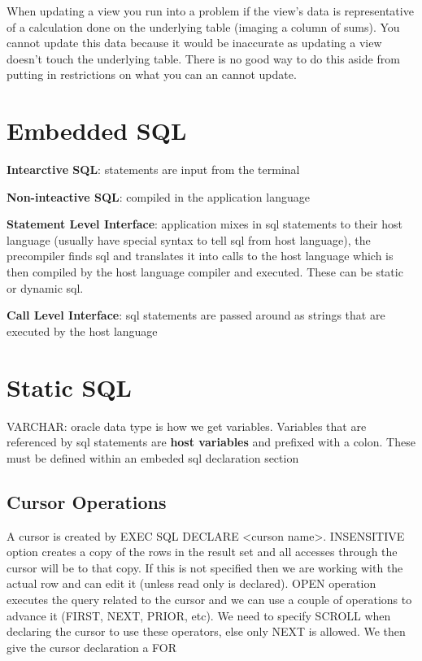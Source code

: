 \documentclass{article}
\begin{document}
When updating a view you run into a problem if the view's data is representative of a calculation done on the underlying table (imaging a column of sums). You cannot update this data because it would be inaccurate as updating a view doesn't touch the underlying table. There is no good way to do this aside from putting in restrictions on what you can an cannot update.
\section*{Embedded SQL} %
\label{sec:sql_basics}
\textbf{Intearctive SQL}: statements are input from the terminal

\textbf{Non-inteactive SQL}: compiled in the application language

\textbf{Statement Level Interface}: application mixes in sql statements to their host language (usually have special syntax to tell sql from host language), the precompiler finds sql and translates it into calls to the host language which is then compiled by the host language compiler and executed. These can be static or dynamic sql.

\textbf{Call Level Interface}: sql statements are passed around as strings that are executed by the host language

\section*{Static SQL} %
\label{sec:static_sql}
VARCHAR: oracle data type is how we get variables. Variables that are referenced by sql statements are \textbf{host variables} and prefixed with a colon. These must be defined within an embeded sql declaration section

\subsection*{Cursor Operations} %
\label{sec:cursor_operations}
A cursor is created by EXEC SQL DECLARE <curson name>. INSENSITIVE option creates a copy of the rows in the result set and all accesses through the cursor will be to that copy. If this is not specified then we are working with the actual row and can edit it (unless read only is declared). OPEN operation executes the query related to the cursor and we can use a couple of operations to advance it (FIRST, NEXT, PRIOR, etc). We need to specify SCROLL when declaring the cursor to use these operators, else only NEXT is allowed. We then give the cursor declaration a FOR
\end{document}
